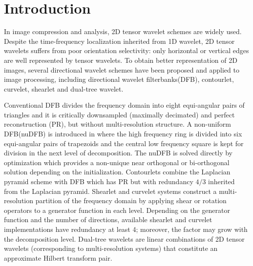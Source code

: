 \section{Introduction}

\iffalse
\begin{itemize}
\item review construction of directional wavelet, shearlet
\item what's new in our construction?
\item summary: framework, technique, reference(Durand, Cohen)
\item organization of the paper
\end{itemize}
\fi

In image compression and analysis, 2D tensor wavelet schemes are widely used. Despite the time-frequency localization inherited from 1D wavelet, 2D tensor wavelets suffers from poor orientation selectivity: only horizontal or vertical edges are well represented by tensor wavelets. To obtain better representation of 2D images, several directional wavelet schemes have been proposed and applied to image processing, including directional wavelet filterbanks(DFB), contourlet, curvelet, shearlet and dual-tree wavelet.

Conventional DFB \cite{DFB92} divides the frequency domain into eight equi-angular pairs of triangles and it is critically downsampled (maximally decimated) and perfect reconstruction (PR), but without multi-resolution structure. 
A non-uniform DFB(nuDFB) is introduced in \cite{nuDFB05} where the high frequency ring is divided into six equi-angular pairs of trapezoids and the central low frequency square is kept for division in the next level of decomposition. The nuDFB is solved directly by optimization which provides a non-unique near orthogonal or bi-orthogonal solution depending on the initialization.
Contourlets \cite{do2005contourlet} combine the Laplacian pyramid scheme with DFB which has PR but with redundancy $4/3$ inherited from the Laplacian pyramid.
Shearlet \cite{shearlet12book,easley2008sparse} and curvelet \cite{candes2006fast} systems construct a multi-resolution partition of the frequency domain by applying shear or rotation operators to a generator function in each level. Depending on the generator function and the number of directions, available shearlet and curvelet implementations have redundancy at least 4; moreover, the factor may grow with the decomposition level.
Dual-tree wavelets \cite{selesnick2005dual} are linear combinations of 2D tensor wavelets (corresponding to multi-resolution systems) that constitute an approximate Hilbert transform pair. 

